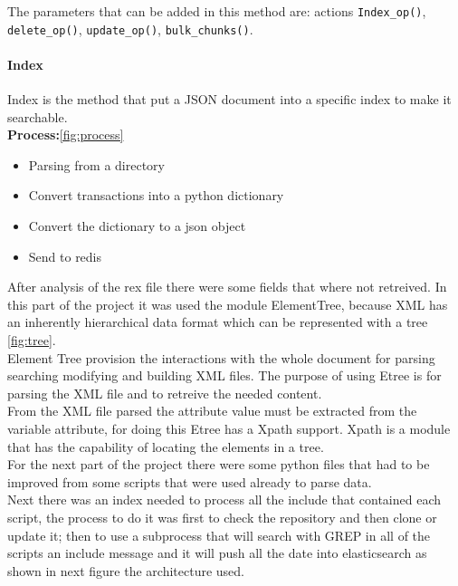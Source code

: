 The parameters that can be added in this method are: actions \texttt{Index\_op()}, \texttt{delete\_op()}, \texttt{update\_op()}, \texttt{bulk\_chunks()}.

\paragraph{Index} Index is the method that put a JSON document into a specific index to make it searchable.
\\

\textbf{Process:}\autoref{fig:process}
\begin{itemize}
\item Parsing from a directory 
\item Convert transactions into a python dictionary
\item Convert the dictionary to a json object
\item Send to redis
\end{itemize}

After analysis of the rex file there were some fields that where not retreived. In this part of the project it was used the module ElementTree, because XML has an inherently hierarchical data format which can be represented with a tree \autoref{fig:tree}. 
\\

Element Tree provision the interactions with the whole document for parsing searching modifying and building XML files.
The purpose of using Etree is for parsing the XML file and to retreive the needed content.
\\

From the XML file parsed the attribute value must be extracted from the variable attribute, for doing this Etree has a Xpath support. Xpath is a module that has the capability of locating the elements in a tree.
\\

For the next part of the project there were some python files that had to be improved from some scripts that were used already to parse data. 
\\

Next there was an index needed to process all the include that contained each script, the process to do it was first to check the repository and then clone or update it; then to use a subprocess that will search with GREP in all of the scripts an include message and it will push all the date into elasticsearch as shown in next figure the architecture used.

